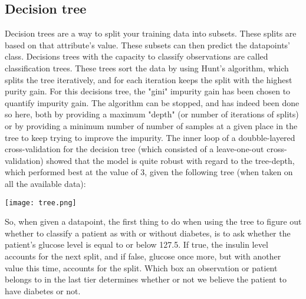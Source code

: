 \subsection{Decision tree}
Decision trees are a way to split your training data into subsets. These splits are based on that attribute's value.
These subsets can then predict the datapoints' class. Decisions trees with the capacity to classify observations are called
classification trees. These trees sort the data by using Hunt's algorithm, which
splits the tree iteratively, and for each iteration keeps the split with the
highest purity gain. For this decisions tree, the "gini" impurity gain has been
chosen to quantify impurity gain. The algorithm can be stopped, and has indeed
been done so here, both by providing a maximum "depth" (or number of iterations
of splits) or by providing a minimum number of number of samples at a given
place in the tree to keep trying to improve the impurity.
The inner loop of a doubble-layered cross-validation for the decision tree
(which consisted of a leave-one-out cross-validation) showed
that the model is quite robust with regard to the tree-depth, which performed
best at the value of 3, given the following tree (when taken on all the available
data):

\texttt{[image: tree.png]}

So, when given a datapoint, the first thing to do when using the tree to figure
out whether to classify a patient as with or without diabetes, is to ask whether
the patient's glucose level is equal to or below 127.5. If true, the insulin level
accounts for the next split, and if false, glucose once more, but with another
value this time, accounts for the split. Which box an observation or patient belongs
to in the last tier determines whether or not we believe the patient to have diabetes
or not.

